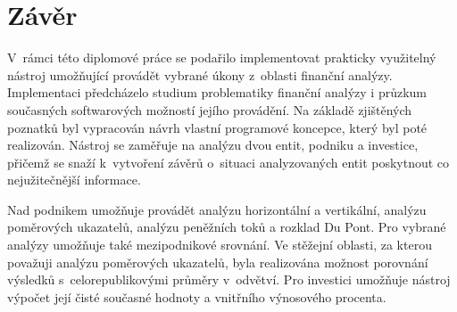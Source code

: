 


















































\chapter{Závěr}
V~rámci této diplomové práce se podařilo implementovat prakticky využitelný nástroj umožňující provádět vybrané úkony z~oblasti finanční analýzy. Implementaci předcházelo studium problematiky finanční analýzy i průzkum současných softwarových možností jejího provádění. Na základě zjištěných poznatků byl vypracován návrh vlastní programové koncepce, který byl poté realizován. Nástroj se zaměřuje na analýzu dvou entit, podniku a investice, přičemž se snaží k~vytvoření závěrů o~situaci analyzovaných entit poskytnout co nejužitečnější informace.

Nad podnikem umožňuje provádět analýzu horizontální a vertikální, analýzu poměrových ukazatelů, analýzu peněžních toků a rozklad Du Pont. Pro vybrané analýzy umožňuje také mezipodnikové srovnání. Ve stěžejní oblasti, za kterou považuji analýzu poměrových ukazatelů, byla realizována možnost porovnání výsledků s~celorepublikovými průměry v~odvětví. Pro investici umožňuje nástroj výpočet její čisté současné hodnoty a vnitřního výnosového procenta.

